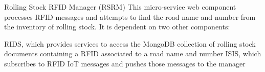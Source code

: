 Rolling Stock RFID Manager (RSRM)
This micro-service web component processes RFID messages and attempts to find the road name and number from the inventory of rolling stock. It is dependent on two other components:

RIDS, which provides services to access the MongoDB collection of rolling stock documents containing a RFID associated to a road name and number
ISIS, which subscribes to RFID IoT messages and pushes those messages to the manager

